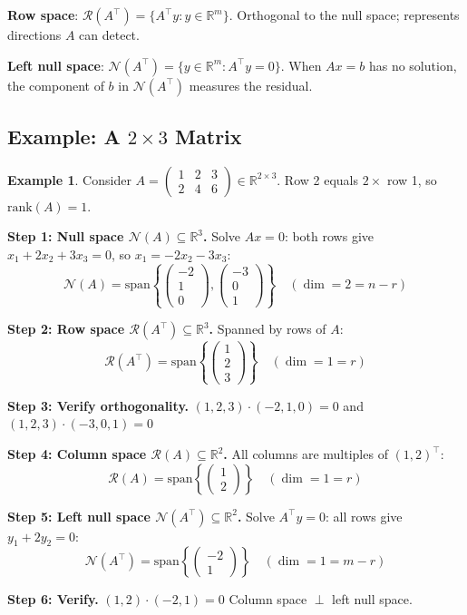 \documentclass[10pt, twocolumn]{article}
\theoremstyle{definition}
\newtheorem{example}{Example}
\theoremstyle{plain}
\newcommand{\RR}{\mathbb{R}}
\newcommand{\NN}{\mathcal{N}}
\newcommand{\Range}{\mathcal{R}}
\begin{document}
\textbf{Row space}: $\Range(A^\top) = \{A^\top y : y \in \RR^m\}$. Orthogonal to the null space; represents directions $A$ can detect.

\textbf{Left null space}: $\NN(A^\top) = \{y \in \RR^m : A^\top y = 0\}$. When $Ax = b$ has no solution, the component of $b$ in $\NN(A^\top)$ measures the residual.

\subsection{Example: A $2 \times 3$ Matrix}

\begin{example}
Consider $A = \begin{pmatrix} 1 & 2 & 3 \\ 2 & 4 & 6 \end{pmatrix} \in \RR^{2 \times 3}$. Row 2 equals $2 \times$ row 1, so $\text{rank}(A) = 1$.

\textbf{Step 1: Null space $\NN(A) \subseteq \RR^3$.} Solve $Ax = 0$: both rows give $x_1 + 2x_2 + 3x_3 = 0$, so $x_1 = -2x_2 - 3x_3$:
\[
    \NN(A) = \text{span}\left\{ \begin{pmatrix} -2 \\ 1 \\ 0 \end{pmatrix}, \begin{pmatrix} -3 \\ 0 \\ 1 \end{pmatrix} \right\} \quad (\dim = 2 = n - r)
\]

\textbf{Step 2: Row space $\Range(A^\top) \subseteq \RR^3$.} Spanned by rows of $A$:
\[
    \Range(A^\top) = \text{span}\left\{ \begin{pmatrix} 1 \\ 2 \\ 3 \end{pmatrix} \right\} \quad (\dim = 1 = r)
\]

\textbf{Step 3: Verify orthogonality.} $(1,2,3) \cdot (-2,1,0) = 0$ \checkmark\quad and $(1,2,3) \cdot (-3,0,1) = 0$ \checkmark

\textbf{Step 4: Column space $\Range(A) \subseteq \RR^2$.} All columns are multiples of $(1,2)^\top$:
\[
    \Range(A) = \text{span}\left\{ \begin{pmatrix} 1 \\ 2 \end{pmatrix} \right\} \quad (\dim = 1 = r)
\]

\textbf{Step 5: Left null space $\NN(A^\top) \subseteq \RR^2$.} Solve $A^\top y = 0$: all rows give $y_1 + 2y_2 = 0$:
\[
    \NN(A^\top) = \text{span}\left\{ \begin{pmatrix} -2 \\ 1 \end{pmatrix} \right\} \quad (\dim = 1 = m - r)
\]

\textbf{Step 6: Verify.} $(1,2) \cdot (-2,1) = 0$ \checkmark\quad Column space $\perp$ left null space.
\end{example}
\end{document}
